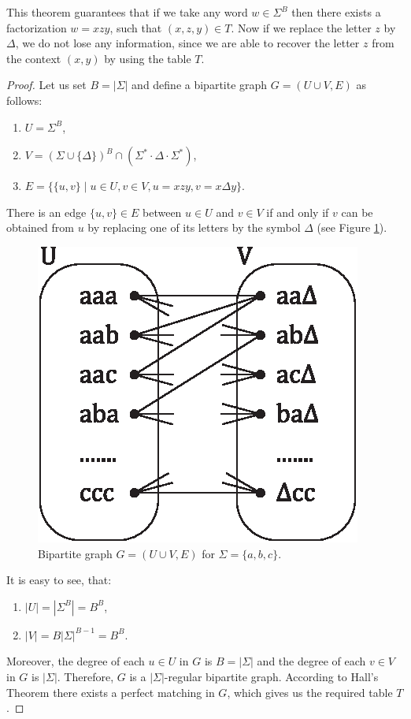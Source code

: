 This theorem guarantees that if we take any word $w \in \Sigma^B$ then there exists a factorization $w = xzy$, such that $(x, z, y) \in T$. Now if we replace the letter $z$ by $\Delta$, we do not lose any information, since we are able to recover the letter $z$ from the context $(x, y)$ by using the table $T$.

\begin{proof}
Let us set $B = |\Sigma|$ and define a bipartite graph $G = (U \cup V, E)$ as follows:
\begin{enumerate}
\item $U = \Sigma^B$,
\item $V = (\Sigma \cup \{\Delta\})^B \cap (\Sigma^* \cdot \Delta \cdot \Sigma^*)$,
\item $E = \{ \{u, v\} \mid u \in U, v \in V, u = xzy, v = x \Delta y\}$.
\end{enumerate}
There is an edge $\{u, v\} \in E$ between $u \in U$ and $v \in V$ if and only if $v$ can be obtained from $u$ by replacing one of its letters by the symbol $\Delta$ (see Figure \ref{figure:graph}).
\begin{figure}[htp]
\centering
\includegraphics[scale=1.0]{graph.eps}
\caption[Bipartite graph $G = (U \cup V, E)$ for $\Sigma = \{a, b, c\}$.]
{Bipartite graph $G = (U \cup V, E)$ for $\Sigma = \{a, b, c\}$.}
\label{figure:graph}
\end{figure}
It is easy to see, that:
\begin{enumerate}
\item $|U| = |\Sigma^B| = B^B$,
\item $|V| = B |\Sigma|^{B-1} = B^B$.
\end{enumerate}
Moreover, the degree of each $u \in U$ in $G$ is $B = |\Sigma|$ and the degree of each $v \in V$ in $G$ is $|\Sigma|$. Therefore, $G$ is a $|\Sigma|$-regular bipartite graph. According to Hall's Theorem \cite{Hall1935} there exists a perfect matching in $G$, which gives us the required table $T$.
\end{proof}

